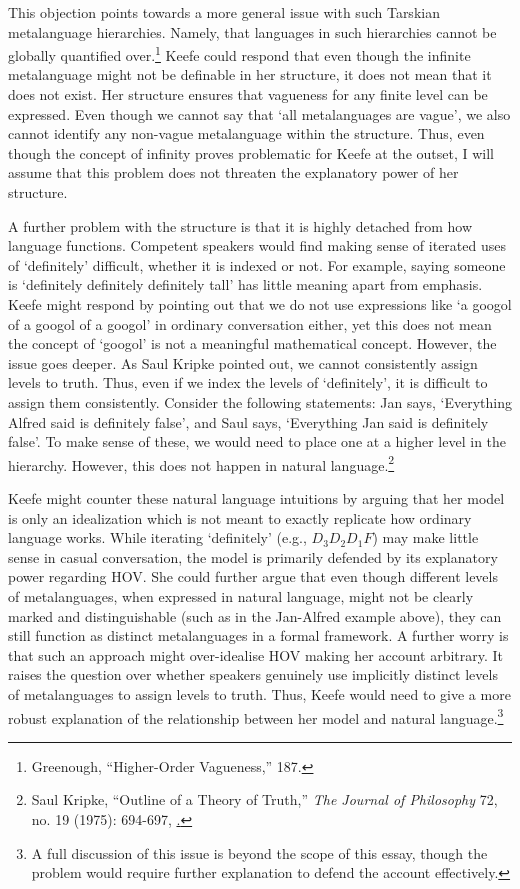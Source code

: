 This objection points towards a more general issue with such Tarskian
metalanguage hierarchies. Namely, that languages in such hierarchies
cannot be globally quantified over.\footnote{Greenough, ``Higher-Order
  Vagueness,'' 187.} Keefe could respond that even though the infinite
metalanguage might not be definable in her structure, it does not mean
that it does not exist. Her structure ensures that vagueness for any
finite level can be expressed. Even though we cannot say that `all
metalanguages are vague', we also cannot identify any non-vague
metalanguage within the structure. Thus, even though the concept of
infinity proves problematic for Keefe at the outset, I will assume that
this problem does not threaten the explanatory power of her structure.

A further problem with the structure is that it is highly detached from
how language functions. Competent speakers would find making sense of
iterated uses of `definitely' difficult, whether it is indexed or not.
For example, saying someone is `definitely definitely definitely tall'
has little meaning apart from emphasis. Keefe might respond by pointing
out that we do not use expressions like `a googol of a googol of a
googol' in ordinary conversation either, yet this does not mean the
concept of `googol' is not a meaningful mathematical concept. However,
the issue goes deeper. As Saul Kripke pointed out, we cannot
consistently assign levels to truth. Thus, even if we index the levels
of `definitely', it is difficult to assign them consistently. Consider
the following statements: Jan says, `Everything Alfred said is
definitely false', and Saul says, `Everything Jan said is definitely
false'. To make sense of these, we would need to place one at a higher
level in the hierarchy. However, this does not happen in natural
language.\footnote{Saul Kripke, ``Outline of a Theory of Truth,''
  \emph{The Journal of Philosophy} 72, no. 19 (1975): 694-697,
  \href{https://www.jstor.org/stable/2024634}.}

Keefe might counter these natural language intuitions by arguing that
her model is only an idealization which is not meant to exactly
replicate how ordinary language works. While iterating `definitely'
(e.g., \(D_{3}D_{2}D_{1}F\)) may make little sense in casual
conversation, the model is primarily defended by its explanatory power
regarding HOV. She could further argue that even though different levels
of metalanguages, when expressed in natural language, might not be
clearly marked and distinguishable (such as in the Jan-Alfred example
above), they can still function as distinct metalanguages in a formal
framework. A further worry is that such an approach might over-idealise
HOV making her account arbitrary. It raises the question over whether
speakers genuinely use implicitly distinct levels of metalanguages to
assign levels to truth. Thus, Keefe would need to give a more robust
explanation of the relationship between her model and natural
language.\footnote{A full discussion of this issue is beyond the scope
  of this essay, though the problem would require further explanation to
  defend the account effectively.}

